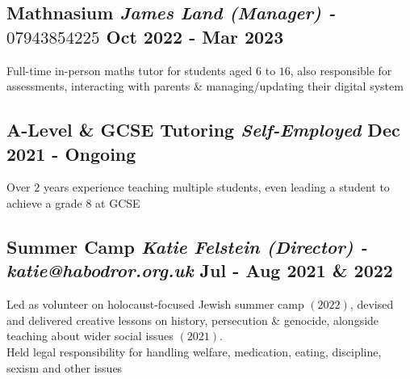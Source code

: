 \documentclass[a4paper,10pt]{article}
\begin{document}
\subsection*{Mathnasium \hfill 
{\color{black}\textit{\textmd{James Land (Manager) - $07943854225$}}}\hspace{1ex} Oct 2022 - Mar 2023}
Full-time in-person maths tutor for students aged $6$ to $16$, also responsible for assessments, interacting with parents \& managing/updating their digital system

\subsection*{A-Level \& GCSE Tutoring  \hfill
{\color{black}\textit{\textmd{Self-Employed}}}\hspace{1ex} Dec 2021 - Ongoing}
Over $2$ years experience teaching multiple students, even leading a student to achieve a grade $8$ at GCSE

\subsection*{Summer Camp \hfill 
{\color{black}\textit{\textmd{Katie Felstein (Director) - katie@habodror.org.uk}}}\hspace{1ex} Jul - Aug 2021 \& 2022}
Led as volunteer on holocaust-focused Jewish summer camp $(2022)$, devised and delivered creative lessons on history, persecution \& genocide, alongside teaching about wider social issues $(2021)$.\\
Held legal responsibility for handling welfare, medication, eating, discipline, sexism and other issues
\end{document}
